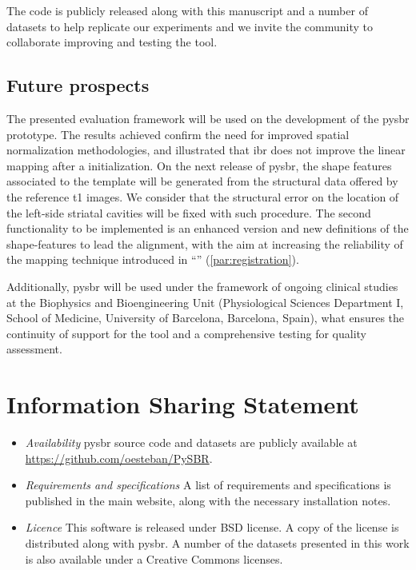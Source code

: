 \documentclass{frontiers}
\newcommand{\cbstart}{\relax}
\newcommand{\cbend}{\relax}
\newcommand{\emitem}[1]{\item \emph{#1}}
\begin{document}
The code is publicly released along with this manuscript and
  a number of datasets to help replicate our experiments and we
  invite the community to collaborate improving and testing
  the tool.
\cbstart
\subsection{Future prospects}
The presented evaluation framework will be used on the development
  of the \gls*{pysbr} prototype.
The results achieved confirm the need for improved spatial normalization
  methodologies, and illustrated that \gls*{ibr} does not improve the
  linear mapping after a initialization.
On the next release of \gls*{pysbr}, the shape features associated to the
  template will be generated from the structural data offered by the 
  reference \gls*{t1} images.
We consider that the structural error on the location of the left-side striatal
  cavities will be fixed with such procedure.
The second functionality to be implemented is an enhanced version and 
  new definitions of the shape-features to lead the alignment,
  with the aim at increasing the reliability of the mapping technique
  introduced in ``'' (\autoref{par:registration}).

Additionally, \gls*{pysbr} will be used under the framework of
  ongoing clinical studies at the Biophysics 
  and Bioengineering Unit (Physiological 
  Sciences Department I, School of Medicine, University of 
  Barcelona, Barcelona, Spain), what ensures the
  continuity of support for the tool and a comprehensive
  testing for quality assessment.
\cbend

\section*{Information Sharing Statement}
\label{sec:iss}

\begin{itemize}
\emitem{Availability} \gls*{pysbr} source code and datasets are
  publicly available at \url{https://github.com/oesteban/PySBR}.

\emitem{Requirements and specifications} A list of requirements and
  specifications is published in the main website, along with
  the necessary installation notes.

\emitem{Licence} This software is released under BSD license.
  A copy of the license is distributed along with \gls*{pysbr}.
  A number of the datasets presented in this work is also
  available under a Creative Commons licenses.
\end{itemize}
\end{document}

